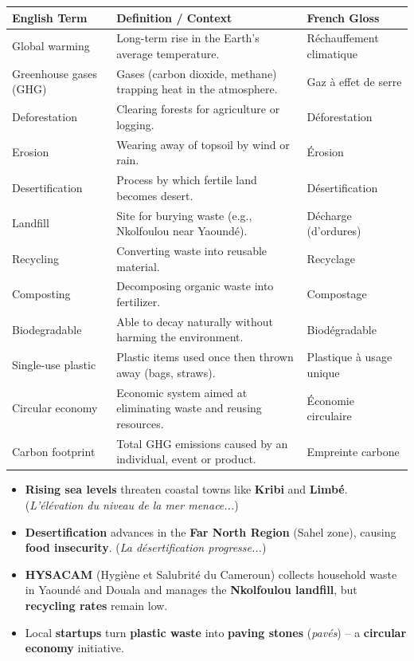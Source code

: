 \documentclass[11pt]{article}
\begin{document}
\begin{center}
\begin{tabularx}{\linewidth}{|l|X|l|}
\hline
\rowcolor{popblueL}
\textbf{English Term} & \textbf{Definition / Context} & \textbf{French Gloss} \\
\hline
Global warming & Long-term rise in the Earth's average temperature. & Réchauffement climatique \\
\hline
Greenhouse gases (GHG) & Gases (carbon dioxide, methane) trapping heat in the atmosphere. & Gaz à effet de serre \\
\hline
Deforestation & Clearing forests for agriculture or logging. & Déforestation \\
\hline
Erosion & Wearing away of topsoil by wind or rain. & Érosion \\
\hline
Desertification & Process by which fertile land becomes desert. & Désertification \\
\hline
Landfill & Site for burying waste (e.g., Nkolfoulou near Yaoundé). & Décharge (d'ordures) \\
\hline
Recycling & Converting waste into reusable material. & Recyclage \\
\hline
Composting & Decomposing organic waste into fertilizer. & Compostage \\
\hline
Biodegradable & Able to decay naturally without harming the environment. & Biodégradable \\
\hline
Single-use plastic & Plastic items used once then thrown away (bags, straws). & Plastique à usage unique \\
\hline
Circular economy & Economic system aimed at eliminating waste and reusing resources. & Économie circulaire \\
\hline
Carbon footprint & Total GHG emissions caused by an individual, event or product. & Empreinte carbone \\
\hline
\end{tabularx}
\end{center}

\begin{exemplebox}
\begin{itemize}
    \item \textbf{Rising sea levels} threaten coastal towns like \textbf{Kribi} and \textbf{Limbé}. (\emph{L'élévation du niveau de la mer menace...})
    \item \textbf{Desertification} advances in the \textbf{Far North Region} (Sahel zone), causing \textbf{food insecurity}. (\emph{La désertification progresse...})
    \item \textbf{HYSACAM} (Hygiène et Salubrité du Cameroun) collects household waste in Yaoundé and Douala and manages the \textbf{Nkolfoulou landfill}, but \textbf{recycling rates} remain low.
    \item Local \textbf{startups} turn \textbf{plastic waste} into \textbf{paving stones} (\emph{pavés}) -- a \textbf{circular economy} initiative.
\end{itemize}
\end{exemplebox}
\end{document}
